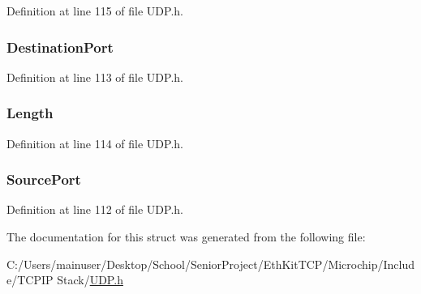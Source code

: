Definition at line 115 of file U\+D\+P.\+h.

\hypertarget{struct_u_d_p___h_e_a_d_e_r_a7249d81f4d0632c7ae87851e34d39a33}{}
\subsubsection[{Destination\+Port}]{ Destination\+Port}\label{struct_u_d_p___h_e_a_d_e_r_a7249d81f4d0632c7ae87851e34d39a33}


Definition at line 113 of file U\+D\+P.\+h.

\hypertarget{struct_u_d_p___h_e_a_d_e_r_a716d105478dd9de36ec29bc981795f47}{}
\subsubsection[{Length}]{ Length}\label{struct_u_d_p___h_e_a_d_e_r_a716d105478dd9de36ec29bc981795f47}


Definition at line 114 of file U\+D\+P.\+h.

\hypertarget{struct_u_d_p___h_e_a_d_e_r_a6b6e2c1584b17d33bae5fdd61f5eae52}{}
\subsubsection[{Source\+Port}]{ Source\+Port}\label{struct_u_d_p___h_e_a_d_e_r_a6b6e2c1584b17d33bae5fdd61f5eae52}


Definition at line 112 of file U\+D\+P.\+h.



The documentation for this struct was generated from the following file\+:\begin{DoxyCompactItemize}
\item 
C\+:/\+Users/mainuser/\+Desktop/\+School/\+Senior\+Project/\+Eth\+Kit\+T\+C\+P/\+Microchip/\+Include/\+T\+C\+P\+I\+P Stack/\hyperlink{_u_d_p_8h}{U\+D\+P.\+h}\end{DoxyCompactItemize}
